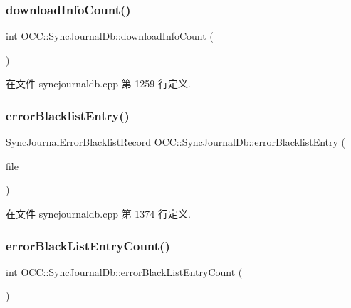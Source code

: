 \subsubsection{\texorpdfstring{download\+Info\+Count()}{downloadInfoCount()}}
{\footnotesize\ttfamily int O\+C\+C\+::\+Sync\+Journal\+Db\+::download\+Info\+Count (\begin{DoxyParamCaption}{ }\end{DoxyParamCaption})}



在文件 syncjournaldb.\+cpp 第 1259 行定义.

\mbox{\label{class_o_c_c_1_1_sync_journal_db_a066b31be221ca33165db386208673979}} 
\subsubsection{\texorpdfstring{error\+Blacklist\+Entry()}{errorBlacklistEntry()}}
{\footnotesize\ttfamily \hyperlink{class_o_c_c_1_1_sync_journal_error_blacklist_record}{Sync\+Journal\+Error\+Blacklist\+Record} O\+C\+C\+::\+Sync\+Journal\+Db\+::error\+Blacklist\+Entry (\begin{DoxyParamCaption}\item[{const Q\+String \&}]{file }\end{DoxyParamCaption})}



在文件 syncjournaldb.\+cpp 第 1374 行定义.

\mbox{\label{class_o_c_c_1_1_sync_journal_db_ad805febce9478b797ae3b7ba3fb8e15c}} 
\subsubsection{\texorpdfstring{error\+Black\+List\+Entry\+Count()}{errorBlackListEntryCount()}}
{\footnotesize\ttfamily int O\+C\+C\+::\+Sync\+Journal\+Db\+::error\+Black\+List\+Entry\+Count (\begin{DoxyParamCaption}{ }\end{DoxyParamCaption})}



